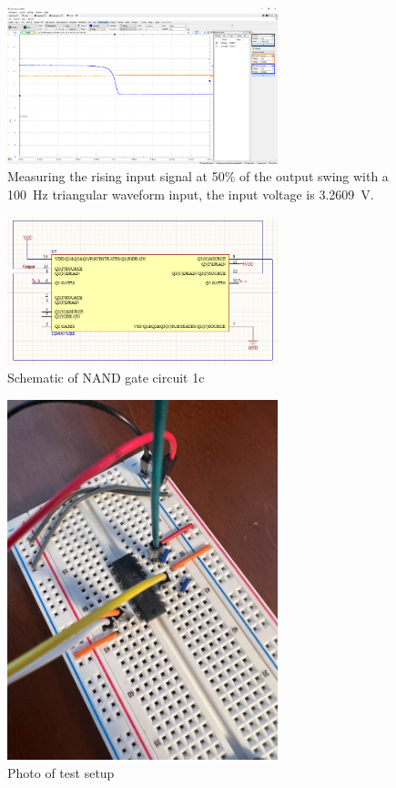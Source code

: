 \documentclass{article}
\begin{document}
	\begin{figure}[H]
	    \centering
	    \includegraphics[width=0.7\textwidth]{2b-2-falling-thresh-lab}
	    \caption[Measuring the rising input signal]{Measuring the rising input signal at 50\% of the output swing with a \SI{100}{Hz} triangular waveform input, the input voltage is \SI{3.2609}{V}.}
	\end{figure}
	
	\begin{figure}[H]
	    \centering
	    \includegraphics[width=0.7\textwidth]{2c-nand-lab}
	    \caption{Schematic of NAND gate circuit 1c}
	\end{figure}
	
	\begin{figure}[H]
	    \centering
	    \includegraphics[width=0.7\textwidth]{2c-nand-photo}
	    \caption{Photo of test setup}
	\end{figure}
	
\end{document}
